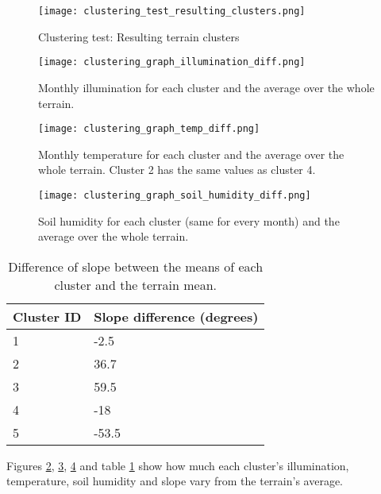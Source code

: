 \begin{figure}
\center
	\texttt{[image: clustering\_test\_resulting\_clusters.png]}
	\caption{ Clustering test: Resulting terrain clusters}	
	\label{fig:clustering_test_resulting_clusters}
\end{figure}

\begin{figure}
\center
	\texttt{[image: clustering\_graph\_illumination\_diff.png]}
	\caption{ Monthly illumination for each cluster and the average over the whole terrain.}	
	\label{fig:clustering_graph_illumination}
\end{figure}

\begin{figure}
\center
	\texttt{[image: clustering\_graph\_temp\_diff.png]}
	\caption{ Monthly temperature for each cluster and the average over the whole terrain. Cluster 2 has the same values as cluster 4.}	
	\label{fig:clustering_graph_temp}
\end{figure}

\begin{figure}
\center
	\texttt{[image: clustering\_graph\_soil\_humidity\_diff.png]}
	\caption{ Soil humidity for each cluster (same for every month) and the average over the whole terrain.}	
	\label{fig:clustering_graph_humidity}
\end{figure}

\begin{table}[]
  \centering
	\begin{tabular}{|p{5cm}|p{5cm}|}
	\hline
	\textbf{Cluster ID} & \textbf{Slope difference (degrees)}\\
	\hline
	1 & -2.5 \\	
	\hline
	2 & 36.7\\	
	\hline
	3 & 59.5\\	
	\hline
	4 & -18\\	
	\hline
	5 & -53.5\\		
	\hline
	\end{tabular}
	\caption{ Difference of slope between the means of each cluster and the terrain mean.}
	\label{tab:clustering_slope_mean}
\end{table}

Figures \ref{fig:clustering_graph_illumination}, \ref{fig:clustering_graph_temp}, \ref{fig:clustering_graph_humidity} and table \ref{tab:clustering_slope_mean} show how much each cluster's illumination, temperature, soil humidity and slope vary from the terrain's average.\\ 

